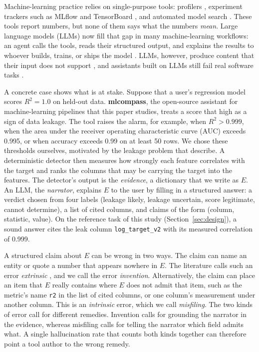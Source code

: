 \documentclass[10pt,twocolumn]{article}
\begin{document}
Machine-learning practice relies on single-purpose tools:
profilers \citep{ydata}, experiment trackers such as MLflow and
TensorBoard \citep{mlflow,tensorflow}, and automated model
search \citep{autosklearn}. These tools report numbers, but none of them says what
the numbers \emph{mean}. Large language models (LLMs) now fill
that gap in many machine-learning workflows: an agent calls the tools, reads
their structured output, and explains the results to whoever builds, trains,
or ships the model \citep{react,toolformer,mcp}. LLMs, however, produce
content that their input does not support \citep{ji,huang}, and assistants
built on LLMs still fail real software tasks \citep{codex,swebench}.

A concrete case shows what is at stake. Suppose that a user's regression
model scores $R^2=1.0$ on held-out data. \textbf{mlcompass}, the open-source
assistant for machine-learning pipelines that this paper studies, treats a
score that high as a sign of data leakage. The tool raises the alarm, for
example, when $R^2>0.999$, when the area under the receiver operating
characteristic curve (AUC) exceeds 0.995, or when accuracy exceeds 0.99 on at
least 50 rows. We chose these thresholds ourselves, motivated by the leakage
problem that \citet{leakage} describe. A deterministic
detector then measures how strongly each feature correlates with the target
and ranks the columns that may be carrying the target into the features. The
detector's output is the \emph{evidence}, a dictionary that we write as $E$.
An LLM, the \emph{narrator}, explains $E$ to the user by filling in a
structured answer: a verdict chosen from four labels (leakage likely, leakage
uncertain, score legitimate, cannot determine), a list of cited columns, and
claims of the form (column, statistic, value). On the reference task of this
study (Section~\ref{sec:design}), a sound answer cites the leak column
\texttt{log\_target\_v2} with its measured correlation of 0.999.

A structured claim about $E$ can be wrong in two ways. The claim can name an
entity or quote a number that appears nowhere in $E$. The literature calls
such an error \emph{extrinsic} \citep{ji,maynez2020faithfulness}, and we call
the error \emph{invention}. Alternatively, the claim can place an item that $E$
really contains where $E$ does not admit that item, such as the metric's name
\texttt{r2} in the list of cited columns, or one column's measurement under
another column. This is an \emph{intrinsic} error, which we call
\emph{misfiling}. The two kinds of error call for different remedies.
Invention calls for grounding the narrator in the evidence, whereas misfiling
calls for telling the narrator which field admits what. A single hallucination
rate that counts both kinds together can therefore point a tool author to the
wrong remedy.
\end{document}
